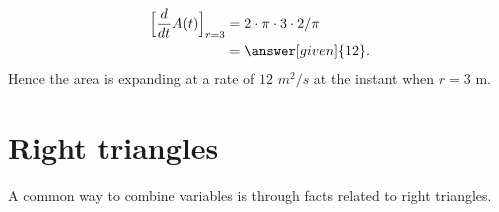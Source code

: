 \documentclass{ximera}
\begin{document}
\begin{example}
\begin{explanation}
    \begin{align*}
     \Bigl[ \dfrac{d}{dt}A(t)\Bigr]_{r=3} &= 2\cdot \pi\cdot 3 \cdot 2/\pi\\
      &=\answer[given]{12}.
    \end{align*}
    Hence the area is expanding at a rate of $12$ $m^2/s$ at the instant when $r=3$ m.
  \end{explanation}
\end{example}





\section{Right triangles}

A common way to combine variables is through facts related to right
triangles.
\end{document}
